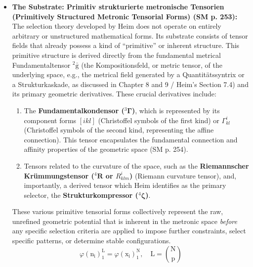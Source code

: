 \documentclass[12pt]{article}
\newcommand{\q}[1]{\enquote{#1}}
\newcommand{\kompositionsfeld}{{}^2\bar{\mathrm{g}}}
\newcommand{\fundamentalkondensor}{{}^3\bm{\Gamma}}
\newcommand{\strukturkompressor}{{}^4\bm{\zeta}}
\begin{document}
\begin{itemize}
    \item \textbf{The Substrate: Primitiv strukturierte metronische Tensorien (Primitively Structured Metronic Tensorial Forms) (SM p. 253):}
    The selection theory developed by Heim does not operate on entirely arbitrary or unstructured mathematical forms. Its substrate consists of tensor fields that already possess a kind of \q{primitive} or inherent structure. This primitive structure is derived directly from the fundamental metrical Fundamentaltensor \( \kompositionsfeld \) (the Kompositionsfeld, or metric tensor, of the underlying space, e.g., the metrical field generated by a Quantitätssyntrix or a Strukturkaskade, as discussed in Chapter 8 and 9 / Heim's Section 7.4) and its primary geometric derivatives. These crucial derivatives include:
    \begin{enumerate}
        \item The \textbf{Fundamentalkondensor (\( \fundamentalkondensor \))}, which is represented by its component forms \( [ikl] \) (Christoffel symbols of the first kind) or \( \Gamma^i_{kl} \) (Christoffel symbols of the second kind, representing the affine connection). This tensor encapsulates the fundamental connection and affinity properties of the geometric space (SM p. 254).
        \item Tensors related to the curvature of the space, such as the \textbf{Riemannscher Krümmungstensor (\( {}^4\mathbf{R} \) or \( R^i_{klm} \))} (Riemann curvature tensor), and, importantly, a derived tensor which Heim identifies as the primary selector, the \textbf{Strukturkompressor (\( \strukturkompressor \))}.
    \end{enumerate}
    These various primitive tensorial forms collectively represent the raw, unrefined geometric potential that is inherent in the metronic space \textit{before} any specific selection criteria are applied to impose further constraints, select specific patterns, or determine stable configurations.
    \begin{equation}
    \varphi(\mathrm{n_i})_1^\mathrm{L} = \varphi(\mathrm{x_i})_1^\mathrm{N}, \quad \mathrm{L} = \binom{\mathrm{N}}{\mathrm{p}} \tag{83}
    \end{equation}


\end{itemize}
\end{document}
